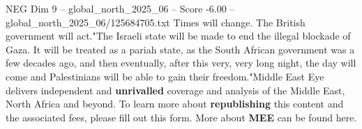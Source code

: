 \begin{textsample}{NEG Dim 9 – global\_north\_2025\_06 – Score -6.00 – global\_north\_2025\_06/125684705.txt}
Times will change.
The British government will act."The Israeli state will be made to end the illegal blockade of Gaza.
It will be treated as a pariah state, as the South African government was a few decades ago, and then eventually, after this very, very long night, the day will come and Palestinians will be able to gain their freedom."Middle East Eye delivers independent and \textbf{unrivalled} coverage and analysis of the Middle East, North Africa and beyond.
To learn more about \textbf{republishing} this content and the associated fees, please fill out this form.
More about \textbf{MEE} can be found here.

\end{textsample}
